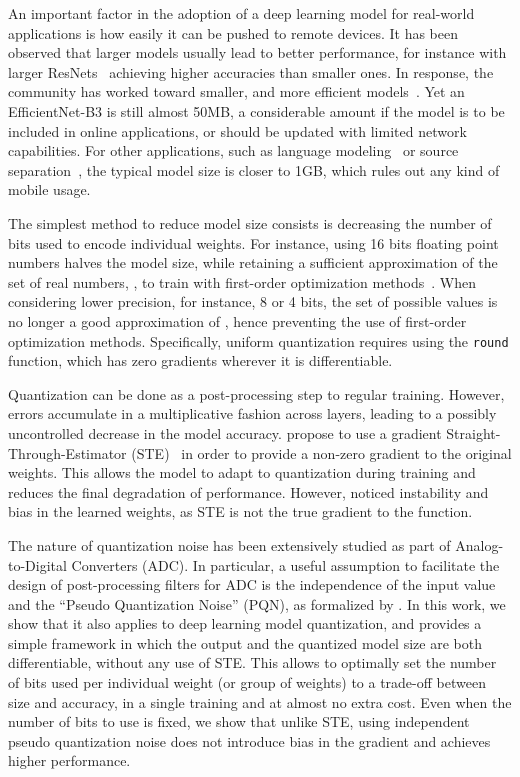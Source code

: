 \documentclass{article}
\begin{document}
An important factor in the adoption of a deep learning model for real-world applications is how easily it can be pushed
to remote devices. It has been observed that larger models usually lead to better performance, for instance
with larger ResNets~\citep{he2016deep} achieving higher accuracies than smaller ones.
In response, the community has worked toward smaller, and more efficient models~\citep{tan2019efficientnet}. Yet
an EfficientNet-B3 is still almost 50MB, a considerable amount if the model is to be included in online applications,
or should be updated with limited network capabilities. For other applications, such as language modeling~\citep{vaswani2017attention} or source separation~\citep{defossez2019music}, the typical model size is closer to 1GB, which rules out any kind of mobile usage.

The simplest method to reduce model size consists is decreasing the number of bits used to encode individual weights. For instance, using 16 bits floating point numbers halves the model size, while retaining a sufficient approximation of the set of real numbers, , to train with first-order optimization methods~\citep{micikevicius2017mixed}.
When considering lower precision, for instance, 8 or 4 bits, the set of possible values is no longer a good approximation of , hence preventing the use of first-order optimization methods. Specifically, uniform quantization requires using the \texttt{round} function, which has zero gradients wherever it is differentiable.

Quantization can be done as a post-processing step to regular training. However, errors accumulate in a multiplicative fashion across layers, leading to a possibly uncontrolled decrease in the model accuracy.
\citet{krishnamoorthi2018quantizing} propose to use a gradient Straight-Through-Estimator (STE)~\citep{bengio2013estimating} in order to provide a non-zero gradient to the original weights. This allows the model to adapt to quantization during training and reduces the final degradation of performance. However, \citet{fan2020training} noticed instability and bias in the learned weights, as STE is not the true gradient to the function.

The nature of quantization noise has been extensively studied as part of Analog-to-Digital Converters (ADC). In particular, a useful assumption to facilitate the design of post-processing filters for ADC is
the independence of the input value and the ``Pseudo Quantization Noise'' (PQN), as formalized by \citet{widrow1996statistical}. In this work, we show that it also applies to deep learning model quantization, and provides a simple framework in which the output and the quantized model size are both differentiable, without any use of STE. This allows to optimally set the number of bits used per individual weight (or group of weights) to a trade-off between size and accuracy, in a single training and at almost no extra cost. Even when the number of bits to use is fixed, we show that unlike STE, using independent pseudo quantization noise does not introduce bias in the gradient and achieves higher performance.
\end{document}

